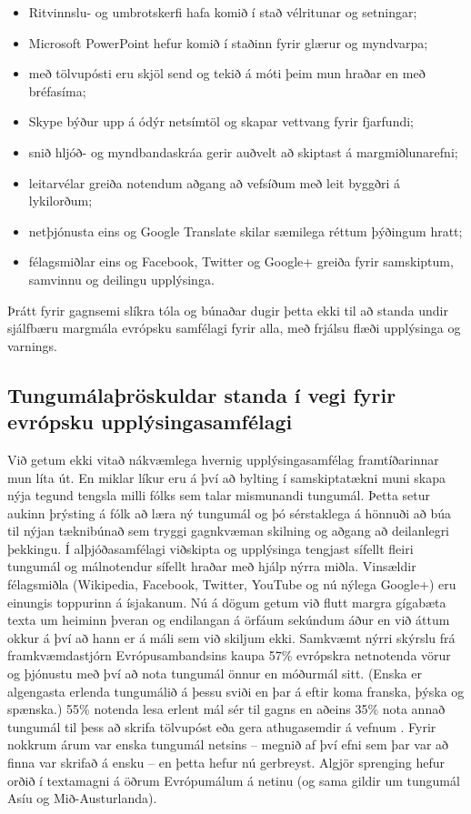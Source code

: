 \begin{multicols}{2}
\begin{itemize}
\item Ritvinnslu- og umbrotskerfi hafa komið í stað vélritunar og setningar;
\item Microsoft PowerPoint hefur komið í staðinn fyrir glærur og myndvarpa;
\item með tölvupósti eru skjöl send og tekið á móti þeim mun hraðar en með bréfasíma;
\item Skype býður upp á ódýr netsímtöl og skapar vettvang fyrir fjarfundi;
\item snið hljóð- og myndbandaskráa gerir auðvelt að skiptast á margmiðlunarefni;
\item leitarvélar greiða notendum aðgang að vefsíðum með leit byggðri á lykilorðum;
\item netþjónusta eins og Google Translate skilar sæmilega réttum þýðingum hratt;
\item félagsmiðlar eins og Facebook, Twitter og Google+ greiða fyrir samskiptum, samvinnu og deilingu upplýsinga. 
\end{itemize}

Þrátt fyrir gagnsemi slíkra tóla og búnaðar dugir þetta ekki til að standa undir sjálfbæru margmála evrópsku samfélagi fyrir alla, með frjálsu flæði upplýsinga og varnings.

\subsection{Tungumálaþröskuldar standa í vegi fyrir evrópsku upplýsinga\-samfélagi}
  
Við getum ekki vitað nákvæmlega hvernig upplýsingasamfélag framtíðarinnar mun líta út. En miklar líkur eru á því að bylting í samskiptatækni muni skapa nýja tegund tengsla milli fólks sem talar mismunandi tungumál. Þetta setur aukinn þrýsting á fólk að læra ný tungumál og þó sérstaklega á hönnuði að búa til nýjan tæknibúnað sem tryggi gagnkvæman skilning og aðgang að deilanlegri þekkingu. Í alþjóðasamfélagi viðskipta og upplýsinga tengjast sífellt fleiri tungumál og málnotendur sífellt hraðar með hjálp nýrra miðla. Vinsældir félagsmiðla (Wikipedia, Facebook, Twitter, YouTube og nú nýlega Google+) eru einungis toppurinn á ísjakanum.
Nú á dögum getum við flutt margra gígabæta texta um heiminn þveran og endilangan á örfáum sekúndum áður en við áttum okkur á því að hann er á máli sem við skiljum ekki. Samkvæmt nýrri skýrslu frá framkvæmdastjórn Evrópusambandsins kaupa 57\% evrópskra netnotenda vörur og þjónustu með því að nota tungumál önnur en móðurmál sitt. (Enska er algengasta erlenda tungumálið á þessu sviði en þar á eftir koma franska, þýska og spænska.) 55\% notenda lesa erlent mál sér til gagns en aðeins 35\% nota annað tungumál til þess að skrifa tölvupóst eða gera athugasemdir á vefnum \cite{EC1}. Fyrir nokkrum árum var enska tungumál netsins -- megnið af því efni sem þar var að finna var skrifað á ensku -- en þetta hefur nú gerbreyst. Algjör sprenging hefur orðið í textamagni á öðrum Evrópumálum á netinu (og sama gildir um tungumál Asíu og Mið-Austurlanda). 


\end{multicols}
